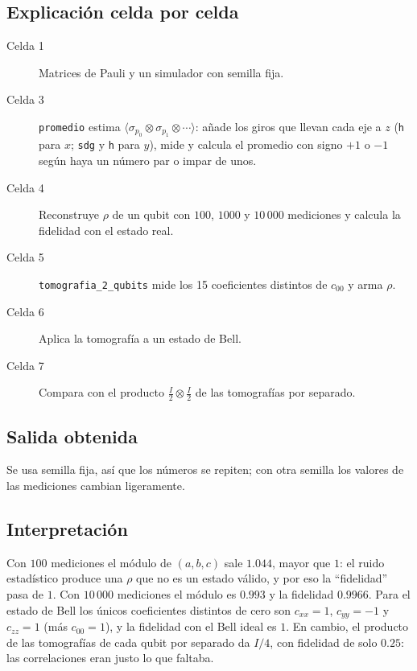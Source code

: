 \subsection{Explicación celda por celda}
\begin{description}
  \item[Celda 1] Matrices de Pauli y un simulador con semilla fija.
  \item[Celda 3] \texttt{promedio} estima $\langle\sigma_{p_0}\otimes\sigma_{p_1}\otimes\cdots\rangle$:
    añade los giros que llevan cada eje a $z$ (\texttt{h} para $x$;
    \texttt{sdg} y \texttt{h} para $y$), mide y calcula el promedio con signo
    $+1$ o $-1$ según haya un número par o impar de unos.
  \item[Celda 4] Reconstruye $\rho$ de un qubit con $100$, $1000$ y $10\,000$
    mediciones y calcula la fidelidad con el estado real.
  \item[Celda 5] \texttt{tomografia\_2\_qubits} mide los 15 coeficientes
    distintos de $c_{00}$ y arma $\rho$.
  \item[Celda 6] Aplica la tomografía a un estado de Bell.
  \item[Celda 7] Compara con el producto $\frac I2\otimes\frac I2$ de las
    tomografías por separado.
\end{description}

\subsection{Salida obtenida}

Se usa semilla fija, así que los números se repiten; con otra semilla los
valores de las mediciones cambian ligeramente.

\subsection{Interpretación}
Con $100$ mediciones el módulo de $(a,b,c)$ sale $1.044$, mayor que $1$: el
ruido estadístico produce una $\rho$ que no es un estado válido, y por eso la
``fidelidad'' pasa de $1$. Con $10\,000$ mediciones el módulo es $0.993$ y la
fidelidad $0.9966$. Para el estado de Bell los únicos coeficientes distintos de
cero son $c_{xx}=1$, $c_{yy}=-1$ y $c_{zz}=1$ (más $c_{00}=1$), y la fidelidad
con el Bell ideal es $1$. En cambio, el producto de las tomografías de cada
qubit por separado da $I/4$, con fidelidad de solo $0.25$: las correlaciones
eran justo lo que faltaba.

